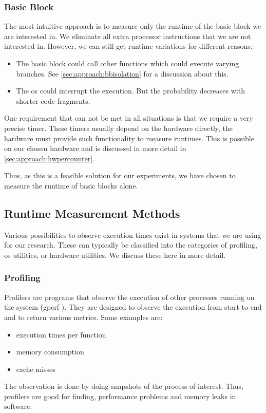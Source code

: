 \subsubsection{Basic Block}
\tobechecked
The most intuitive approach is to measure only the runtime of the basic block we are interested in.
We eliminate all extra processor instructions that we are not interested in.
However, we can still get runtime variations for different reasons:
\begin{itemize}
    \item The basic block could call other functions which could execute varying branches. 
          See \cref{sec:approach:bbisolation} for a discussion about this.
    \item The \ac{os} could interrupt the execution. 
          But the probability decreases with shorter code fragments.
\end{itemize}

One requirement that can not be met in all situations is that we require a very precise timer.
These timers usually depend on the hardware directly, \ie the hardware must provide such functionality to measure runtimes.
This is possible on our chosen hardware and is discussed in more detail in \cref{sec:approach:hwpercounter}.

Thus, as this is a feasible solution for our experiments, we have chosen to measure the runtime of basic blocks alone.
    
\subsection{Runtime Measurement Methods}
\tobechecked
\label{sec:approach:datageneration:runtime_methods}
Various possibilities to observe execution times exist in systems that we are using for our research.
These can typically be classified into the categories of profiling, \ac{os} utilities, or hardware utilities.
We discuss these here in more detail.

\subsubsection{Profiling}
\tobechecked
Profilers are programs that observe the execution of other processes running on the system (\eg gperf \cite{graham1982gprof}).
They are designed to observe the execution from start to end and to return various metrics. Some examples are:
\begin{itemize}
    \item execution times per function
    \item memory consumption
    \item cache misses
\end{itemize}
The observation is done by doing snapshots of the process of interest.
Thus, profilers are good for finding, \eg performance problems and memory leaks in software.

